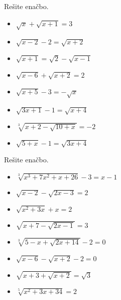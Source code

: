         
            \begin{naloga}
                Rešite enačbo.
                \begin{multicols}{2}
                    \begin{itemize}
                        \item $\displaystyle \sqrt{x}+\sqrt{x+1}=3$ 
                        \item $\displaystyle \sqrt{x-2}-2=\sqrt{x+2}$ 
                        \item $\displaystyle \sqrt{x+1}=\sqrt{2}-\sqrt{x-1}$ 
                        \item $\displaystyle \sqrt{x-6}+\sqrt{x+2}=2$ 
                        \item $\displaystyle \sqrt{x+5}-3=-\sqrt{x}$ 
                        \item $\displaystyle \sqrt{3x+1}-1=\sqrt{x+4}$ 
                        \item $\displaystyle \sqrt[3]{x+2-\sqrt{10+x}}=-2$ 
                        \item $\displaystyle \sqrt{5+x}-1=\sqrt{3x+4}$ 
                    \end{itemize}
                \end{multicols}
            \end{naloga}

        
            \begin{naloga}
                Rešite enačbo.
                \begin{multicols}{2}
                    \begin{itemize}
                        \item $\displaystyle \sqrt[3]{x^3+7x^2+x+26}-3=x-1$ 
                        \item $\displaystyle \sqrt{x-2}-\sqrt{2x-3}=2$ 
                        \item $\displaystyle \sqrt{x^2+3x}+x=2$ 
                        \item $\displaystyle \sqrt{x+7-\sqrt{2x-1}}=3$ 
                        \item $\displaystyle \sqrt[3]{5-x+\sqrt{2x+14}}-2=0$ 
                        \item $\displaystyle \sqrt{x-6}-\sqrt{x+2}-2=0$ 
                        \item $\displaystyle \sqrt{x+3+\sqrt{x+2}}=\sqrt{3}$ 
                        \item $\displaystyle \sqrt[5]{x^2+3x+34}=2$ 
                    \end{itemize}
                \end{multicols}
            \end{naloga}
        

